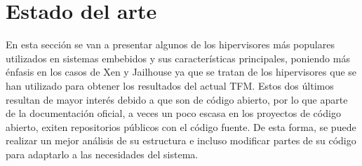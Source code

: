 \chapter{Estado del arte}
En esta sección se van a presentar algunos de los hipervisores más populares utilizados en sistemas embebidos y sus características principales, poniendo más énfasis en los casos de Xen y Jailhouse ya que se tratan de los hipervisores que se han utilizado para obtener los resultados del actual TFM. Estos dos últimos resultan de mayor interés debido a que son de código abierto, por lo que aparte de la documentación oficial, a veces un poco escasa en los proyectos de código abierto, exiten repositorios públicos con el código fuente. De esta forma, se puede realizar un mejor análisis de su estructura e incluso modificar partes de su código para adaptarlo a las necesidades del sistema.

